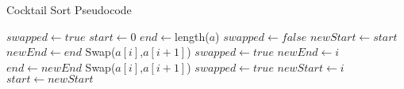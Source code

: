 \documentclass{subfile}
\begin{document}
\newpage
\begin{algorithm}
  \caption{Cocktail Sort Pseudocode}\label{C:CT:1}
  \begin{algorithmic}[1]
      \State $swapped\gets true$
      \State $start\gets 0$
      \State $end\gets$length($a$)
        \State $swapped\gets false$
        \State $newStart\gets start$
        \State $newEnd\gets end$
            \State Swap($a[i]$,$a[i+1]$)
            \State $swapped\gets true$
            \State $newEnd\gets i$
          \EndIf
        \EndFor
        \State $end\gets newEnd$
            \State Swap($a[i]$,$a[i+1]$)
            \State $swapped\gets true$
            \State $newStart\gets i$
          \EndIf
        \EndFor
        \State $start\gets newStart$
      \EndWhile
    \EndFunction
  \end{algorithmic}
\end{algorithm}
\newpage
\end{document}

